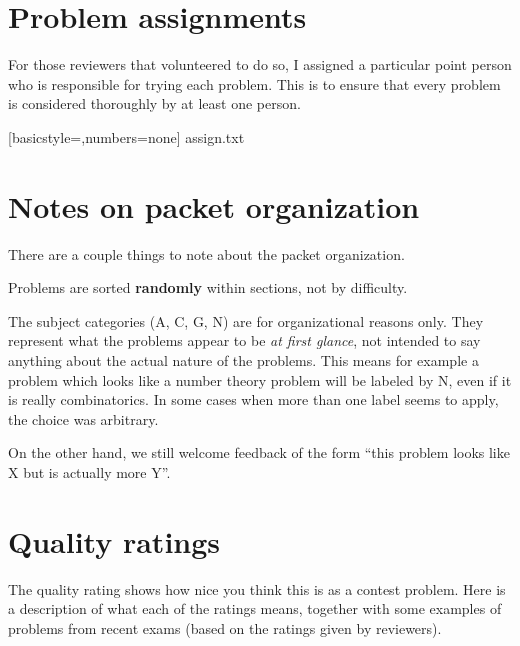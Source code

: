 \section{Problem assignments}
For those reviewers that volunteered to do so,
I assigned a particular point person who is responsible
for trying each problem.
This is to ensure that every problem is
considered thoroughly by at least one person.

%
[basicstyle=\ttfamily,numbers=none]
{assign.txt}


\newpage

\section{Notes on packet organization}
There are a couple things to note about the packet organization.
\begin{itemize}
	\ii Problems are sorted \textbf{randomly}
	within sections, not by difficulty.

	\ii The subject categories (A, C, G, N)
	are for organizational reasons only.
	They represent what the problems appear
	to be \emph{at first glance},
	not intended to say anything about the
	actual nature of the problems.
	This means for example a problem which looks
	like a number theory problem will be labeled by N,
	even if it is really combinatorics.
	In some cases when more than one label seems to apply,
	the choice was arbitrary.

	On the other hand, we still welcome feedback of the form
	``this problem looks like X but is actually more Y''.
\end{itemize}

\section{Quality ratings}
The quality rating shows how nice you think this is as a contest problem.
Here is a description of what each of the ratings means,
together with some examples of problems from recent exams
(based on the ratings given by reviewers).

